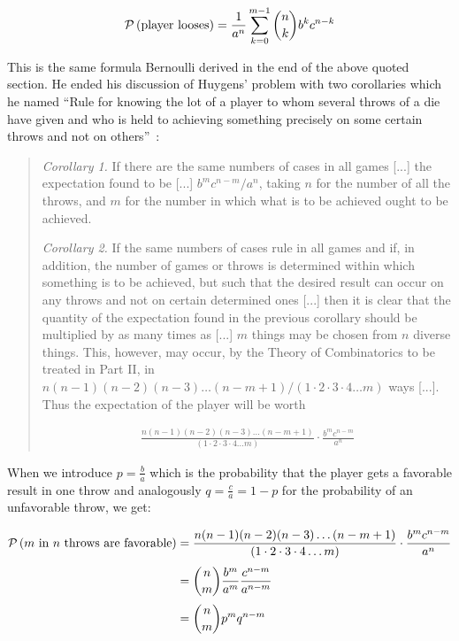 \begin{align}
  \P{\text{player looses}} = \frac{1}{a^n} \sum_{k=0}^{m-1} \binom nk b^k c^{n-k}
\end{align}

This is the same formula Bernoulli derived in the end of the above quoted section. He ended his discussion of Huygens' problem with two corollaries which he named ``Rule for knowing the lot of a player to whom several throws of a die have given and who is held to achieving something precisely on some certain throws and not on others''~\cite[p. 170]{bernoulli}:

\begin{quotation}
  \emph{Corollary 1.} If there are the same numbers of cases in all games [...] the expectation found to be [...] $b^mc^{n-m}/a^n$, taking $n$ for the number of all the throws, and $m$ for the number in which what is to be achieved ought to be achieved.

  \emph{Corollary 2.} If the same numbers of cases rule in all games and if, in addition, the number of games or throws is determined within which something is to be achieved, but such that the desired result can occur on any throws and not on certain determined ones [...] then it is clear that the quantity of the expectation found in the previous corollary should be multiplied by as many times as [...] $m$ things may be chosen from $n$ diverse things. This, however, may occur, by the Theory of Combinatorics to be treated in Part II, in $n(n-1)(n-2)(n-3)\ldots(n-m+1)/(1\cdot 2\cdot 3\cdot 4\ldots m)$ ways [...]. Thus the expectation of the player will be worth

  \begin{align*}
    \frac{n(n-1)(n-2)(n-3)\ldots(n-m+1)}{(1\cdot 2\cdot 3\cdot 4\ldots m)}\cdot \frac{b^mc^{n-m}}{a^n}
  \end{align*}
\end{quotation}

When we introduce $p=\tfrac ba$ which is the probability that the player gets a favorable result in one throw and analogously $q=\tfrac ca=1-p$ for the probability of an unfavorable throw, we get:

\begin{align}
  \P{\text{$m$ in $n$ throws are favorable}} & = \frac{n(n-1)(n-2)(n-3)\ldots(n-m+1)}{(1\cdot 2\cdot 3\cdot 4\ldots m)}\cdot \frac{b^mc^{n-m}}{a^n} \nl
  &= \binom nm \frac{b^m}{a^m} \frac{c^{n-m}}{a^{n-m}} \nl
  &= \binom nm p^m q^{n-m}
\end{align}

